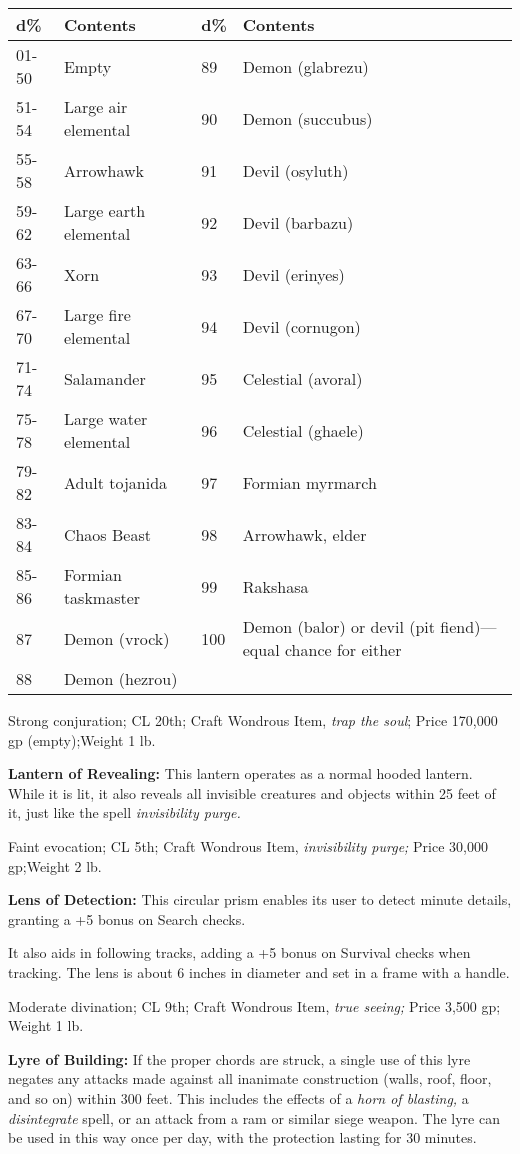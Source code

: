 \documentclass{article}
\begin{document}
\begin{tabular}{|>{\raggedright}p{28pt}|>{\raggedright}p{93pt}|>{\raggedright}p{19pt}|>{\raggedright}p{131pt}|}
\hline
d\textbf{\%} & C\textbf{ontents} & d\textbf{\%} & C\textbf{ontents}\tabularnewline
\hline
01-50 & Empty & 89 & Demon (glabrezu)\tabularnewline
\hline
51-54 & Large air elemental & 90 & Demon (succubus)\tabularnewline
\hline
55-58 & Arrowhawk & 91 & Devil (osyluth)\tabularnewline
\hline
59-62 & Large earth elemental & 92 & Devil (barbazu)\tabularnewline
\hline
63-66 & Xorn & 93 & Devil (erinyes)\tabularnewline
\hline
67-70 & Large fire elemental & 94 & Devil (cornugon)\tabularnewline
\hline
71-74 & Salamander & 95 & Celestial (avoral)\tabularnewline
\hline
75-78 & Large water elemental & 96 & Celestial (ghaele)\tabularnewline
\hline
79-82 & Adult tojanida & 97 & Formian myrmarch\tabularnewline
\hline
83-84 & Chaos Beast & 98 & Arrowhawk, elder\tabularnewline
\hline
85-86 & Formian taskmaster & 99 & Rakshasa\tabularnewline
\hline
87 & Demon (vrock) & 100 & Demon (balor) or devil (pit fiend)---equal chance for 
either\tabularnewline
\hline
88 & Demon (hezrou)  &  & \tabularnewline
\hline
\end{tabular}

Strong conjuration; CL 20th; Craft Wondrous Item, \textit{trap the soul}; Price 
170,000 gp (empty);Weight 1 lb.

\textbf{Lantern of Revealing:} This lantern operates as a normal hooded lantern. 
While it is lit, it also reveals all invisible creatures and objects within 25 
feet of it, just like the spell \textit{invisibility purge.}

Faint evocation; CL 5th; Craft Wondrous Item, \textit{invisibility purge; }Price 
30,000 gp;Weight 2 lb.

\textbf{Lens of Detection: }This circular prism enables its user to detect minute 
details, granting a +5 bonus on Search checks.

It also aids in following tracks, adding a +5 bonus on Survival checks when tracking. 
The lens is about 6 inches in diameter and set in a frame with a handle.

Moderate divination; CL 9th; Craft Wondrous Item, \textit{true seeing; }Price 3,500 
gp; Weight 1 lb.

\textbf{Lyre of Building: }If the proper chords are struck, a single use of this 
lyre negates any attacks made against all inanimate construction (walls, roof, 
floor, and so on) within 300 feet. This includes the effects of a \textit{horn 
of blasting, }a \textit{disintegrate }spell, or an attack from a ram or similar 
siege weapon. The lyre can be used in this way once per day, with the protection 
lasting for 30 minutes.
\end{document}
